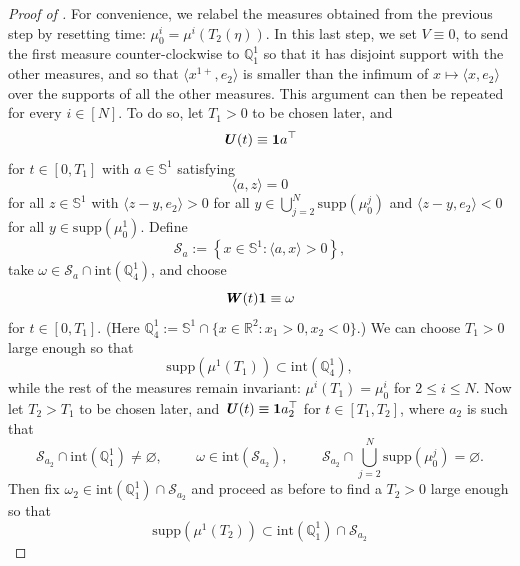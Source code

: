 \documentclass[a4paper,11pt]{article}
\theoremstyle{plain}
\newcommand{\supp}{\mathrm{supp}}
\newcommand{\bW}{\bm{\mathit{W}}}
\newcommand{\bV}{\bm{\mathit{V}}}
\newcommand{\bU}{\bm{\mathit{U}}}
\newcommand{\Q}{\mathbb{Q}}
\renewcommand{\leq}{\leqslant}
\numberwithin{equation}{section}
\begin{document}
\begin{proof}[Proof of ]
For convenience, we relabel the measures obtained from the previous step by resetting time: $\mu_0^i=\mu^i(T_2(\eta))$. 
In this last step, we set $\bV\equiv0$, to send the first measure counter-clockwise to $\mathbb{Q}^1_1$ so that it has disjoint support with the other measures, and so that $\langle x^{1+}, e_2\rangle$ is smaller than the infimum of $x\mapsto\langle x, e_2\rangle$ over the supports of all the other measures. This argument can then be repeated for every $i\in[N]$. To do so, let $T_1>0$ to be chosen later, and
$$\bU(t)\equiv {\bf1}a^\top$$ 
for $t\in[0,T_1]$
with $a\in\mathbb{S}^1$ satisfying
\begin{equation*}
    \langle a,z\rangle=0
\end{equation*}
for all $z\in\mathbb{S}^1$ with $\langle z-y,e_2\rangle>0$ for all $y\in \bigcup_{j=2}^N \supp(\mu_0^j)$ and $\langle z-y, e_2\rangle<0$ for all $y\in \supp(\mu^1_0)$.
Define
\begin{equation*}
    \mathscr{S}_a:=\left\{ x\in \mathbb{S}^1: \langle a,x\rangle >0 \right\},
\end{equation*}
take $\omega\in \mathscr{S}_a\cap \mathrm{int}(\Q_4^1)$, and choose
\begin{equation*}
    \bW(t){\bf1}\equiv\omega
\end{equation*}
for $t\in[0,T_1]$. (Here $\mathbb{Q}_4^1:=\mathbb{S}^1\cap\{x\in\mathbb{R}^2\colon x_1>0, x_2<0\}$.)
We can choose $T_1>0$ large enough so that
\begin{equation*}
\supp\left(\mu^1(T_1)\right)\subset\mathrm{int}\left(\Q_4^1\right),
\end{equation*}
while the rest of the measures remain invariant: $\mu^i(T_1) = \mu^i_0$ for $2\leq i\leq N$. Now let $T_2>T_1$ to be chosen later, and $\bU(t)\equiv{\bf1}a_2^\top$ for $t\in[T_1,T_2]$, where $a_2$ is such that
\begin{equation*}
\mathscr{S}_{a_2}\cap\mathrm{int}\left(\Q_1^1\right)\neq\varnothing, \hspace{1cm} \omega\in\mathrm{int}(\mathscr{S}_{a_2}),\hspace{1cm} \mathscr{S}_{a_2}\cap \bigcup_{j=2}^N\supp\left(\mu_0^j\right) =\varnothing.
\end{equation*}
Then fix $\omega_2\in\mathrm{int}(\Q_1^1)\cap \mathscr{S}_{a_2}$ and proceed as before to find a $T_2>0$ large enough so that
\begin{equation*}
    \supp\left(\mu^1(T_2)\right)\subset \mathrm{int}\left(\Q_1^1\right)\cap\mathscr{S}_{a_2}
\end{equation*}

\end{proof}
\end{document}
